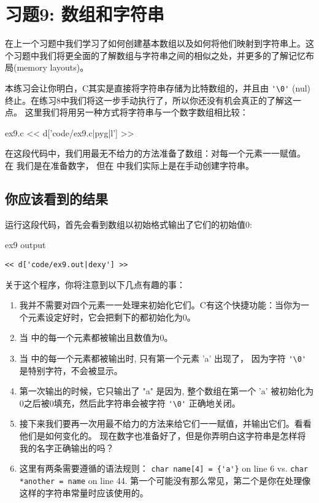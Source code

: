\chapter{习题9: 数组和字符串}

在上一个习题中我们学习了如何创建基本数组以及如何将他们映射到字符串上。这个习题中我们将更全面的了解数组与字符串之间的相似之处，并更多的了解记忆布局(memory layouts)。

本练习会让你明白，C其实是直接将字符串存储为比特数组的，并且由 \verb|'\0'| (nul) 终止。在练习8中我们将这一步手动执行了，所以你还没有机会真正的了解这一点。 这里我们将用另一种方式将字符串与一个数字数组相比较：

\begin{code}{ex9.c}
<< d['code/ex9.c|pyg|l'] >>
\end{code}

在这段代码中，我们用最无不给力的方法准备了数组：对每一个元素一一赋值。 在  我们是在准备数字， 但在  中我们实际上是在手动创建字符串。


\section{你应该看到的结果}

运行这段代码，首先会看到数组以初始格式输出了它们的初始值0:

\begin{code}{ex9 output}
\begin{lstlisting}
<< d['code/ex9.out|dexy'] >>
\end{lstlisting}
\end{code}

关于这个程序，你将注意到以下几点有趣的事：

\begin{enumerate}
\item 我并不需要对四个元素一一处理来初始化它们。C有这个快捷功能：当你为一个元素设定好时，它会把剩下的都初始化为0。
\item 当  中的每一个元素都被输出且数值为0。
\item 当  中的每一个元素都被输出时, 只有第一个元素 'a' 出现了， 因为字符 \verb|'\0'| 是特别字符，不会被显示。 
\item 第一次输出的时候，它只输出了 "a" 是因为, 整个数组在第一个 'a' 被初始化为0之后被0填充，然后此字符串会被字符 \verb|'\0'| 正确地关闭。
\item 接下来我们要再一次用最不给力的方法来给它们一一赋值，并输出它们。看看他们是如何变化的。 现在数字也准备好了，但是你弄明白这字符串是怎样将我的名字正确输出的吗？
\item 这里有两条需要遵循的语法规则：
    \verb|char name[4] = {'a'}| on line 6
    vs. \verb|char *another = name| on line 44.  
	第一个可能没有那么常见，第二个是你在处理像这样的字符串常量时应该使用的。
\end{enumerate}

